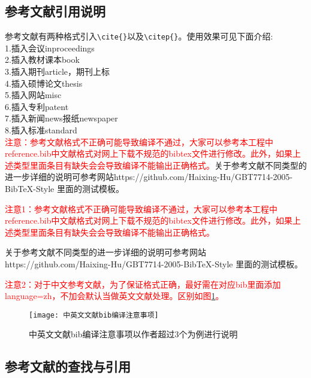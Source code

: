 \documentclass[bachelor_p]{hdu-report}
\begin{document}
\subsection{参考文献引用说明}
参考文献有两种格式引入\verb+\cite{}+以及\verb+\citep{}+。使用效果可见下面介绍:\\
1.插入会议inproceedings\cite{zhao2015bearing}\\
2.插入教材课本book\cite{williams1991probability,chengzhaolin2006}\\
3.插入期刊article\cite{cao2011formation,xue2015formation}，期刊上标\citep{xue2015formation}\\
4.插入硕博论文thesis\cite{lisi2015,wangwu2015,deans2005bearings}\\
5.插入网站misc\cite{irdawebsite,h7n9,wikipedia_moores_law}\\
6.插入专利patent\cite{xiao2012yi,p6915001}\\
7.插入新闻news报纸newspaper\cite{zhang2000,renminribao}\\
8.插入标准standard\cite{gbt3469-1983}\\
\textcolor{red}{注意：参考文献格式不正确可能导致编译不通过，大家可以参考本工程中reference.bib中文献格式对网上下载不规范的bibtex文件进行修改。此外，如果上述类型里面条目有缺失会会导致编译不能输出正确格式。}关于参考文献不同类型的进一步详细的说明可参考网站https://github.com/Haixing-Hu/GBT7714-2005-BibTeX-Style
里面的测试模板。



\textcolor{red}{注意1：参考文献格式不正确可能导致编译不通过，大家可以参考本工程中reference.bib中文献格式对网上下载不规范的bibtex文件进行修改。此外，如果上述类型里面条目有缺失会会导致编译不能输出正确格式。}

关于参考文献不同类型的进一步详细的说明可参考网站https://github.com/Haixing-Hu/GBT7714-2005-BibTeX-Style
里面的测试模板。


\textcolor{red}{注意2：对于中文参考文献，为了保证格式正确，最好需在对应bib里面添加language={zh}，不加会默认当做英文文献处理。区别如图\ref{fig_bib0}。}

\begin{figure}[!htb]
  \centering
  \texttt{[image: 中英文文献bib编译注意事项]}
  \caption{中英文文献bib编译注意事项以作者超过3个为例进行说明}
  \label{fig_bib0}
\end{figure}


\subsection{参考文献的查找与引用}
\end{document}
